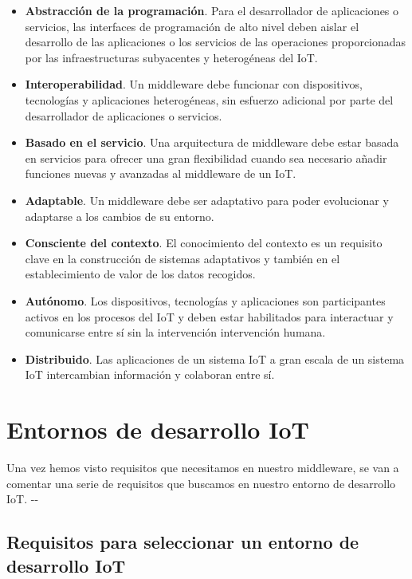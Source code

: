 {\begin{itemize}
    \item \textbf{Abstracción de la programación}. Para el desarrollador de aplicaciones o servicios, las interfaces de programación de alto nivel deben aislar el desarrollo de las aplicaciones o los servicios de las operaciones proporcionadas por las infraestructuras subyacentes y heterogéneas del IoT. 
    \item \textbf{Interoperabilidad}. Un middleware debe funcionar con dispositivos, tecnologías y aplicaciones heterogéneas, sin esfuerzo adicional por parte del desarrollador de aplicaciones o servicios.
    \item \textbf{Basado en el servicio}. Una arquitectura de middleware debe estar basada en servicios para ofrecer una gran flexibilidad cuando sea necesario añadir funciones nuevas y avanzadas al middleware de un IoT.
    \item \textbf{Adaptable}. Un middleware debe ser adaptativo para poder evolucionar y adaptarse a los cambios de su entorno.
    \item \textbf{Consciente del contexto}. El conocimiento del contexto es un requisito clave en la construcción de sistemas adaptativos y también en el establecimiento de valor de los datos recogidos.
    \item \textbf{Autónomo}. Los dispositivos, tecnologías y aplicaciones son participantes activos en los procesos del IoT y deben estar habilitados para interactuar y comunicarse entre sí sin la intervención intervención humana.
    \item \textbf{Distribuido}.  Las aplicaciones de un sistema IoT a gran escala de un sistema IoT intercambian información y colaboran entre sí.
\end{itemize}


\section{Entornos de desarrollo IoT}

Una vez hemos visto requisitos que necesitamos en nuestro middleware, se van a comentar una serie de requisitos que buscamos en nuestro entorno de desarrollo IoT. \cite{agarwal2020investigating}-\cite{dumitru2017iot}-\cite{nakhuva2015study}

\subsection{Requisitos para seleccionar un entorno de desarrollo IoT}

}
